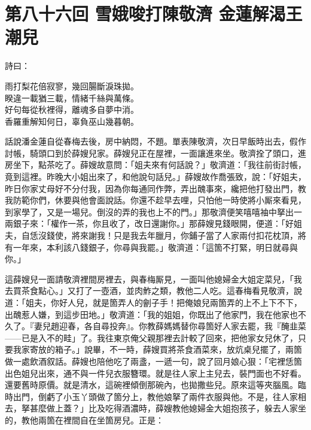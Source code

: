 
\chapter*{第八十六回 雪娥唆打陳敬濟 金蓮解渴王潮兒}


詩曰：

\begin{myquote}
雨打梨花倍寂寥，幾回腸斷淚珠拋。\\睽違一載猶三載，情緒千絲與萬條。\\好句每從秋裡得，離魂多自夢中消。\\香羅重解知何日，辜負巫山幾暮朝。
\end{myquote}

話說潘金蓮自從春梅去後，房中納悶，不題。單表陳敬濟，次日早飯時出去，假作討帳，騎頭口到於薛嫂兒家。薛嫂兒正在屋裡，一面讓進來坐。敬濟拴了頭口，進房坐下，點茶吃了。薛嫂故意問：「姐夫來有何話說？」敬濟道：「我往前街討帳，竟到這裡。昨晚大小姐出來了，和他說句話兒。」薛嫂故作喬張致，{}說：「好姐夫，昨日你家丈母好不分付我，因為你每通同作弊，弄出醜事來，纔把他打發出門，教我防範你們，休要與他會面說話。你還不趁早去哩，只怕他一時使將小厮來看見，到家學了，又是一場兒。倒沒的弄的我也上不的門。」那敬濟便笑嘻嘻袖中拏出一兩銀子來：「權作一茶，你且收了，改日還謝你。」那薛嫂見錢眼開，便道：「好姐夫，自恁沒錢使，將來謝我！只是我去年臘月，你鋪子當了人家兩付扣花枕頂，將有一年來，本利該八錢銀子，你尋與我罷。」{}敬濟道：「這箇不打緊，明日就尋與你。」

這薛嫂兒一面請敬濟裡間房裡去，與春梅厮見，一面叫他媳婦金大姐定菜兒，「我去買茶食點心。」又打了一壺酒，並肉鮓之類，教他二人吃。這春梅看見敬濟，說道：「姐夫，你好人兒，就是箇弄人的劊子手！把俺娘兒兩箇弄的上不上下不下，出醜惹人嫌，到這步田地。」{}敬濟道：「我的姐姐，你既出了他家門，我在他家也不久了。『妻兒趙迎春，各自尋投奔』。你教薛媽媽替你尋箇好人家去罷，我『醃韭菜——已是入不的畦」了。我往東京俺父親那裡去計較了回來，把他家女兒休了，只要我家寄放的箱子。」說畢，不一時，薛嫂買將茶食酒菜來，放炕桌兒擺了，兩箇做一處飲酒叙話。薛嫂也陪他吃了兩盞，一遞一句，說了回月娘心狠：「宅裡恁箇出色姐兒出來，通不與一件兒衣服簪環。就是往人家上主兒去，裝門面也不好看。還要舊時原價。就是清水，這碗裡傾倒那碗內，也拋撒些兒。原來這等夾腦風。臨時出門，倒虧了小玉丫頭做了箇分上，教他娘拏了兩件衣服與他。不是，往人家相去，拏甚麼做上蓋？」比及吃得酒濃時，薛嫂教他媳婦金大姐抱孩子，躲去人家坐的，教他兩箇在裡間自在坐箇房兒。{}正是：

